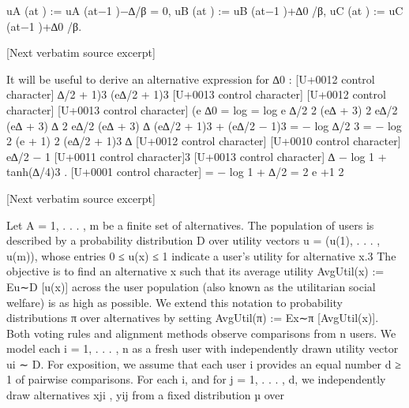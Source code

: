 \documentclass[10pt]{article}
\begin{document}
\begin{ReviewVerbatim}
  uA (at ) := uA (at−1 )−∆/β = 0,                                              uB (at ) := uB (at−1 )+∆0 /β,                                           uC (at ) := uC (at−1 )+∆0 /β.

[Next verbatim source excerpt]

  It will be useful to derive an alternative expression for ∆0 :
                           [U+0012 control character] ∆/2
                                    + 1)3                    (e∆/2 + 1)3
                                           [U+0013 control character]       [U+0012 control character]                       [U+0013 control character]
                             (e
                ∆0 = log                     = log   e ∆/2
                              2 (e∆ + 3)                   2 e∆/2 (e∆ + 3)
                                     ∆       2 e∆/2 (e∆ + 3)     ∆       (e∆/2 + 1)3 + (e∆/2 − 1)3
                                   =   − log      ∆/2      3
                                                              =    − log
                                     2         (e     + 1)       2              (e∆/2 + 1)3
                                     ∆
                                             [U+0012 control character]     [U+0010 control character] e∆/2 − 1 [U+0011 control character]3 [U+0013 control character]
                                                                     ∆
                                                                        − log 1 + tanh(∆/4)3 .
                                                                                              [U+0001 control character]
                                   =   − log 1 + ∆/2               =
                                     2               e    +1         2

[Next verbatim source excerpt]

Let A = {1, . . . , m} be a finite set of alternatives. The population of users is described by a
probability distribution D over utility vectors u = (u(1), . . . , u(m)), whose entries 0 ≤ u(x) ≤ 1
indicate a user’s utility for alternative x.3 The objective is to find an alternative x such that its average
utility AvgUtil(x) := Eu∼D [u(x)] across the user population (also known as the utilitarian social
welfare) is as high as possible. We extend this notation to probability distributions π over alternatives
by setting AvgUtil(π) := Ex∼π [AvgUtil(x)].
Both voting rules and alignment methods observe comparisons from n users. We model each
i = 1, . . . , n as a fresh user with independently drawn utility vector ui ∼ D. For exposition, we
assume that each user i provides an equal number d ≥ 1 of pairwise comparisons. For each i,
and for j = 1, . . . , d, we independently draw alternatives xji , yij from a fixed distribution µ over


\end{ReviewVerbatim}
\end{document}
